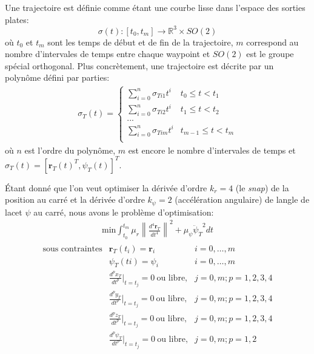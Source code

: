 \documentclass{article}
\newcommand{\norm}[1]{\left\lVert#1\right\rVert}
\begin{document}
Une trajectoire est définie comme étant une courbe lisse dans l'espace des sorties plates:
$$ \sigma(t) : [t_0, t_m] \rightarrow \mathbb{R}^3 \times SO(2)$$ 
où $t_0$ et $t_m$ sont les temps de début et de fin de la trajectoire, $m$ correspond au nombre d'intervales de temps entre chaque waypoint et $SO(2)$ est le groupe spécial orthogonal. Plus concrètement, une trajectoire est décrite par un polynôme défini par parties:
\begin{align}\label{eq:polynomial}
\sigma_T(t) =
\left\{
	\begin{array}{ll}
		\sum_{i=0}^n \sigma_{Ti1} t^i  & t_0 \leq t < t_1 \\
		\sum_{i=0}^n \sigma_{Ti2} t^i  & t_1 \leq t < t_2 \\
		... \\
		\sum_{i=0}^n \sigma_{Tim} t^i  & t_{m-1} \leq t < t_m \\
	\end{array}
\right.
\end{align}
où $n$ est l'ordre du polynôme, $m$ est encore le nombre d'intervales de temps et $\sigma_T (t) = [\boldsymbol{r}_T(t)^T, \psi_T(t)]^T$.

Étant donné que l'on veut optimiser la dérivée d'ordre $k_r = 4$ (le \textit{snap}) de la position au carré et la dérivée d'ordre $k_\psi = 2$ (accélération angulaire) de langle de lacet $\psi$ au carré, nous avons le problème d'optimisation:
\begin{align}\label{eq:opt}
\text{min} \int_{t_0}^{t_m} \mu_r \norm{\frac{d^4 \boldsymbol{r}_T}{dt^4}}^2 + \mu_\psi {\ddot{\psi}_T}^2 dt
\end{align}\begin{align*}
	\begin{array}{lll}
		\text{sous contraintes} & \boldsymbol{r}_T(t_i) = \boldsymbol{r}_i & i = 0, \ldots, m\\
		& \psi_T(ti)=\psi_i & i = 0, \ldots, m\\
		& \frac{d^p x_T}{dt^p}|_{t=t_j} = 0\ \text{ou libre,} & j = 0, m; p = 1, 2, 3, 4\\
		& \frac{d^p y_T}{dt^p}|_{t=t_j} = 0\ \text{ou libre,} & j = 0, m; p = 1, 2, 3, 4\\
		& \frac{d^p z_T}{dt^p}|_{t=t_j} = 0\ \text{ou libre,} & j = 0, m; p = 1, 2, 3, 4\\
		& \frac{d^p \psi_T}{dt^p}|_{t=t_j} = 0\ \text{ou libre,} & j = 0, m; p = 1, 2\\
	\end{array}
\end{align*}
\end{document}
